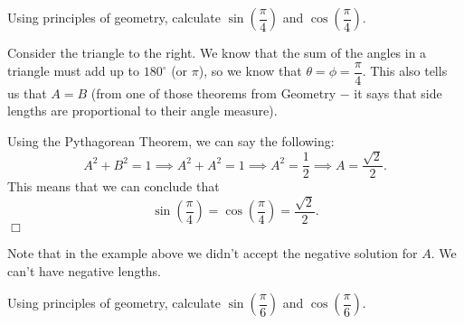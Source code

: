 \documentclass[../book.tex]{subfiles}
\begin{document}
\begin{example}
Using principles of geometry, calculate $\sin\left(\dfrac{\pi}{4}\right)$ and $\cos\left(\dfrac{\pi}{4}\right)$.
\end{example}
\begin{solution}
Consider the triangle to the right. We know that the sum of the angles in a triangle must add up to $180^{\circ}$ (or $\pi$), so we know that $\theta=\phi=\dfrac{\pi}{4}$.  This also tells us that $A=B$ (from one of those theorems from Geometry $-$ it says that side lengths are proportional to their angle measure).

Using the Pythagorean Theorem, we can say the following: $$A^2+B^2=1 \implies A^2+A^2=1 \implies A^2=\dfrac{1}{2} \implies A=\dfrac{\sqrt{2}}{2}.$$ This means that we can conclude that $$\sin\left(\dfrac{\pi}{4}\right)=\cos\left(\dfrac{\pi}{4}\right)=\dfrac{\sqrt{2}}{2}.$$ $\Box$
\end{solution}
\begin{remark}
Note that in the example above we didn't accept the negative solution for $A$.  We can't have negative lengths.
\end{remark}
\begin{example}
Using principles of geometry, calculate $\sin\left(\dfrac{\pi}{6}\right)$ and $\cos\left(\dfrac{\pi}{6}\right)$.
\end{example}
\end{document}
